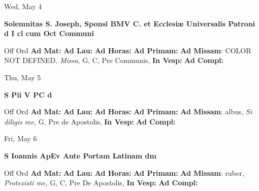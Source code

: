 \documentclass[10pt]{memoir}
\begin{document}
\begin{center}
\begin{minipage}{3.5in}
\vspace{2em}
\begin{center}Wed, May 4
\end{center}
\textbf{ \large Solemnitas S. Joseph, Sponsi BMV C. et Ecclesiæ Universalis Patroni
\textnormal{\normalsize d I cl cum Oct Communi}}

\begin{justify}Off Ord
\textbf{Ad Mat: }
\textbf{Ad Lau: }
\textbf{Ad Horas: }
\textbf{Ad Primam: }\textbf{Ad Missam}: COLOR NOT DEFINED, \textit{Missa,} G, C, Pre Communis, 
\textbf{In Vesp: }
\textbf{Ad Compl: }
\end{justify}
\end{minipage}
\end{center}

\begin{center}
\begin{minipage}{3.5in}
\vspace{2em}
\begin{center}Thu, May 5
\end{center}
\textbf{ \large S Pii V PC
\textnormal{\normalsize d}}

\begin{justify}Off Ord
\textbf{Ad Mat: }
\textbf{Ad Lau: }
\textbf{Ad Horas: }
\textbf{Ad Primam: }\textbf{Ad Missam}: albus, \textit{Si diligis me,} G, Pre de Apostolis, 
\textbf{In Vesp: }
\textbf{Ad Compl: }
\end{justify}
\end{minipage}
\end{center}

\begin{center}
\begin{minipage}{3.5in}
\vspace{2em}
\begin{center}Fri, May 6
\end{center}
\textbf{ \large S Ioannis ApEv Ante Portam Latinam
\textnormal{\normalsize dm}}

\begin{justify}Off Ord
\textbf{Ad Mat: }
\textbf{Ad Lau: }
\textbf{Ad Horas: }
\textbf{Ad Primam: }\textbf{Ad Missam}: ruber, \textit{Protexisti me,} G, C, Pre De Apostolis, 
\textbf{In Vesp: }
\textbf{Ad Compl: }
\end{justify}
\end{minipage}
\end{center}
\end{document}
